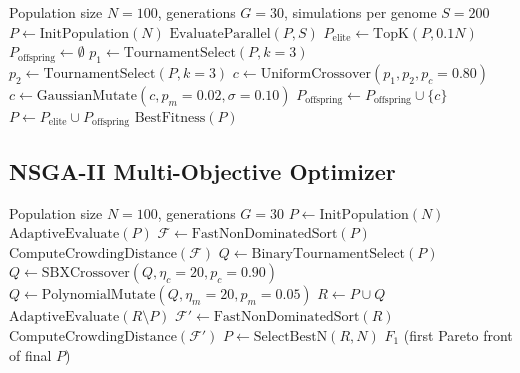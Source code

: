 \begin{algorithm}[H]
\caption{Single-Objective Genetic Algorithm for Game Balancing}
\label{alg:ga}
\begin{algorithmic}[1]
\Require Population size $N=100$, generations $G=30$, simulations per genome $S=200$
\State $P \gets \text{InitPopulation}(N)$  
    \State $\text{EvaluateParallel}(P, S)$  
    \State $P_{\text{elite}} \gets \text{TopK}(P, 0.1N)$  
    \State $P_{\text{offspring}} \gets \emptyset$
        \State $p_1 \gets \text{TournamentSelect}(P, k=3)$
        \State $p_2 \gets \text{TournamentSelect}(P, k=3)$
        \State $c \gets \text{UniformCrossover}(p_1, p_2, p_c=0.80)$
        \State $c \gets \text{GaussianMutate}(c, p_m=0.02, \sigma=0.10)$
        \State $P_{\text{offspring}} \gets P_{\text{offspring}} \cup \{c\}$
    \EndWhile
    \State $P \gets P_{\text{elite}} \cup P_{\text{offspring}}$
\EndFor
\State \Return $\text{BestFitness}(P)$
\end{algorithmic}
\end{algorithm}

\subsection{NSGA-II Multi-Objective Optimizer}

\begin{algorithm}[H]
\caption{NSGA-II for Multi-Objective Game Balancing}
\label{alg:nsga2}
\begin{algorithmic}[1]
\Require Population size $N=100$, generations $G=30$
\State $P \gets \text{InitPopulation}(N)$
\State $\text{AdaptiveEvaluate}(P)$  
    \State $\mathcal{F} \gets \text{FastNonDominatedSort}(P)$  
    \State $\text{ComputeCrowdingDistance}(\mathcal{F})$
    \State $Q \gets \text{BinaryTournamentSelect}(P)$  
    \State $Q \gets \text{SBXCrossover}(Q, \eta_c=20, p_c=0.90)$
    \State $Q \gets \text{PolynomialMutate}(Q, \eta_m=20, p_m=0.05)$
    \State $R \gets P \cup Q$  
    \State $\text{AdaptiveEvaluate}(R \setminus P)$
    \State $\mathcal{F}' \gets \text{FastNonDominatedSort}(R)$
    \State $\text{ComputeCrowdingDistance}(\mathcal{F}')$
    \State $P \gets \text{SelectBestN}(R, N)$  
\EndFor
\State \Return $F_1$ (first Pareto front of final $P$)
\end{algorithmic}
\end{algorithm}


